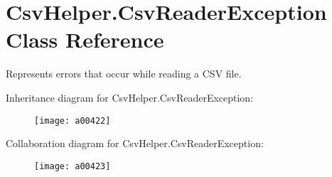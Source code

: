 \hypertarget{a00068}{\section{Csv\-Helper.\-Csv\-Reader\-Exception Class Reference}
\label{a00068}
}


Represents errors that occur while reading a C\-S\-V file.  




Inheritance diagram for Csv\-Helper.\-Csv\-Reader\-Exception\-:
\nopagebreak
\begin{figure}[H]
\begin{center}
\leavevmode
\texttt{[image: a00422]}
\end{center}
\end{figure}


Collaboration diagram for Csv\-Helper.\-Csv\-Reader\-Exception\-:
\nopagebreak
\begin{figure}[H]
\begin{center}
\leavevmode
\texttt{[image: a00423]}
\end{center}
\end{figure}
